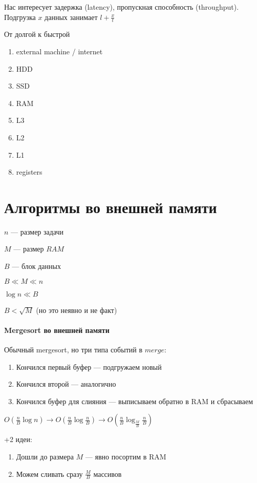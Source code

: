 \documentclass[12pt]{article}
\begin{document}
Нас интересует задержка (latency), пропускная способность (throughput). Подгрузка $x$ данных занимает $l + \frac{x}{t}$

От долгой к быстрой
\begin{enumerate}
\item external machine / internet
\item HDD
\item SSD
\item RAM
\item L3
\item L2
\item L1
\item registers
\end{enumerate}

\section{Алгоритмы во внешней памяти}

$n$ --- размер задачи

$M$ --- размер $RAM$

$B$ --- блок данных

$B \ll M \ll n$

$\log n \ll B$

$B < \sqrt{M}$ (но это неявно и не факт)

\paragraph{Mergesort во внешней памяти}

Обычный mergesort, но три типа событий в $merge$:
\begin{enumerate}
    \item Кончился первый буфер --- подгружаем новый
    \item Кончился второй --- аналогично
    \item Кончился буфер для слияния --- выписываем обратно в RAM и сбрасываем
\end{enumerate}

$O(\frac{n}{B} \log n) \rightarrow O(\frac{n}{B} \log {\frac{n}{B}}) \rightarrow O(\frac{n}{B} \log_{\frac{M}{B}} {\frac{n}{B}})$

+2 идеи: \begin{enumerate}
\item Дошли до размера $M$ --- явно посортим в RAM
\item Можем сливать сразу $\frac{M}{B}$ массивов
\end{enumerate}
\end{document}
